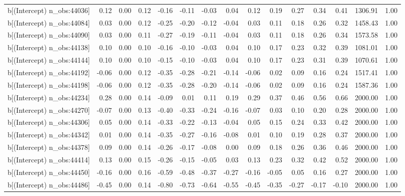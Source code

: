 \begin{table}[ht]
\begin{tabular}{rrrrrrrrrrrrrrr}
  b[(Intercept) n\_obs:44036] & 0.12 & 0.00 & 0.12 & -0.16 & -0.11 & -0.03 & 0.04 & 0.12 & 0.19 & 0.27 & 0.34 & 0.41 & 1306.91 & 1.00 \\ 
  b[(Intercept) n\_obs:44084] & 0.03 & 0.00 & 0.12 & -0.25 & -0.20 & -0.12 & -0.04 & 0.03 & 0.11 & 0.18 & 0.26 & 0.32 & 1458.43 & 1.00 \\ 
  b[(Intercept) n\_obs:44090] & 0.03 & 0.00 & 0.11 & -0.27 & -0.19 & -0.11 & -0.04 & 0.03 & 0.11 & 0.18 & 0.26 & 0.34 & 1573.58 & 1.00 \\ 
  b[(Intercept) n\_obs:44138] & 0.10 & 0.00 & 0.10 & -0.16 & -0.10 & -0.03 & 0.04 & 0.10 & 0.17 & 0.23 & 0.32 & 0.39 & 1081.01 & 1.00 \\ 
  b[(Intercept) n\_obs:44144] & 0.10 & 0.00 & 0.10 & -0.15 & -0.10 & -0.03 & 0.04 & 0.10 & 0.17 & 0.23 & 0.31 & 0.39 & 1070.61 & 1.00 \\ 
  b[(Intercept) n\_obs:44192] & -0.06 & 0.00 & 0.12 & -0.35 & -0.28 & -0.21 & -0.14 & -0.06 & 0.02 & 0.09 & 0.16 & 0.24 & 1517.41 & 1.00 \\ 
  b[(Intercept) n\_obs:44198] & -0.06 & 0.00 & 0.12 & -0.35 & -0.28 & -0.20 & -0.14 & -0.06 & 0.02 & 0.09 & 0.16 & 0.24 & 1587.36 & 1.00 \\ 
  b[(Intercept) n\_obs:44234] & 0.28 & 0.00 & 0.14 & -0.09 & 0.01 & 0.11 & 0.19 & 0.29 & 0.37 & 0.46 & 0.56 & 0.66 & 2000.00 & 1.00 \\ 
  b[(Intercept) n\_obs:44270] & -0.07 & 0.00 & 0.13 & -0.40 & -0.33 & -0.24 & -0.16 & -0.07 & 0.03 & 0.10 & 0.20 & 0.28 & 2000.00 & 1.00 \\ 
  b[(Intercept) n\_obs:44306] & 0.05 & 0.00 & 0.14 & -0.33 & -0.22 & -0.13 & -0.04 & 0.05 & 0.15 & 0.24 & 0.33 & 0.42 & 2000.00 & 1.00 \\ 
  b[(Intercept) n\_obs:44342] & 0.01 & 0.00 & 0.14 & -0.35 & -0.27 & -0.16 & -0.08 & 0.01 & 0.10 & 0.19 & 0.28 & 0.37 & 2000.00 & 1.00 \\ 
  b[(Intercept) n\_obs:44378] & 0.09 & 0.00 & 0.14 & -0.26 & -0.17 & -0.08 & 0.00 & 0.09 & 0.18 & 0.26 & 0.36 & 0.46 & 2000.00 & 1.00 \\ 
  b[(Intercept) n\_obs:44414] & 0.13 & 0.00 & 0.15 & -0.26 & -0.15 & -0.05 & 0.03 & 0.13 & 0.23 & 0.32 & 0.42 & 0.52 & 2000.00 & 1.00 \\ 
  b[(Intercept) n\_obs:44450] & -0.16 & 0.00 & 0.16 & -0.59 & -0.48 & -0.37 & -0.27 & -0.16 & -0.05 & 0.05 & 0.16 & 0.27 & 2000.00 & 1.00 \\ 
  b[(Intercept) n\_obs:44486] & -0.45 & 0.00 & 0.14 & -0.80 & -0.73 & -0.64 & -0.55 & -0.45 & -0.35 & -0.27 & -0.17 & -0.10 & 2000.00 & 1.00 \\ 

\end{tabular}
\end{table}
